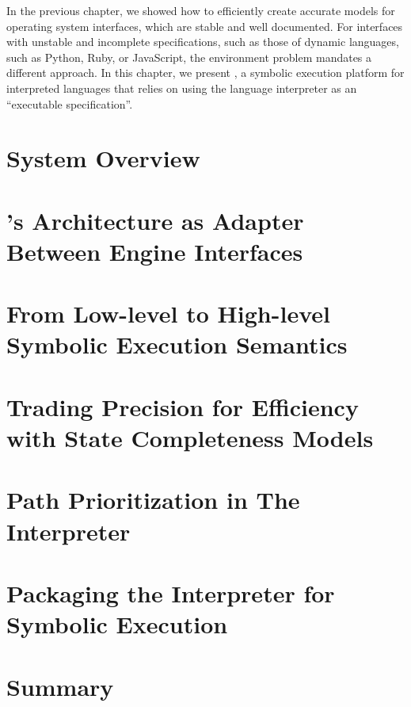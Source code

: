 In the previous chapter, we showed how to efficiently create accurate models for operating system interfaces, which are stable and well documented.
%
For interfaces with unstable and incomplete specifications, such as those of dynamic languages, such as Python, Ruby, or JavaScript, the environment problem mandates a different approach.
%
In this chapter, we present \chef, a symbolic execution platform for interpreted languages that relies on using the language interpreter as an ``executable specification''.



\section{System Overview}


\section{\chef's Architecture as Adapter Between Engine Interfaces}


\section{From Low-level to High-level Symbolic Execution Semantics}


\section{Trading Precision for Efficiency with State Completeness Models}
\label{sec:chef:completeness-models}


\section{Path Prioritization in The Interpreter}
\label{sec:chef:strategies}


\section{Packaging the Interpreter for Symbolic Execution}
\label{sec:chef:recipe}


\section{Summary}

